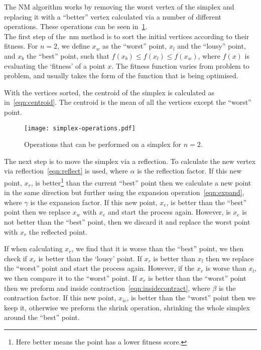 The NM algorithm works by removing the worst vertex of the simplex and replacing it with a ``better'' vertex calculated via a number of different operations.
These operations can be seen in~\cref{fig:NM-operations}.\\

The first step of the~\gls*{nm} method is to sort the initial vertices according to their fitness.
For $n=2$, we define $x_w$ as the ``worst'' point, $x_l$ and the ``lousy'' point, and $x_b$ the ``best'' point, such that $f(x_b)\leq f(x_l)\leq f(x_w)$, where $f(x)$ is evaluating the `fitness' of a point $x$. 
The fitness function varies from problem to problem, and usually takes the form of the function that is being optimised.

With the vertices sorted, the centroid of the simplex is calculated as in~\cref{eqn:centroid}.
The centroid is the mean of all the vertices except the ``worst'' point.

\begin{figure}[!htbp]
    \centering
    \texttt{[image: simplex-operations.pdf]}
    \caption{Operations that can be performed on a simplex for $n=2$.}
    \label{fig:NM-operations}
\end{figure}

The next step is to move the simplex via a reflection.
To calculate the new vertex via reflection~\cref{eqn:reflect} is used, where $\alpha$ is the reflection factor.
If this new point, $x_r$, is better\footnote{Here better means the point has a lower fitness score.} than the current ``best'' point then we calculate a new point in the same direction but further using the expansion operation~\cref{eqn:expand}, where $\gamma$ is the expansion factor.
If this new point, $x_e$, is better than the ``best'' point then we replace $x_w$ with $x_e$ and start the process again.
However, is $x_e$ is not better than the ``best'' point, then we discard it and replace the worst point with $x_r$ the reflected point.

If when calculating $x_r$, we find that it is worse than the ``best'' point, we then check if $x_r$ is better than the `lousy' point.
If $x_r$ is better than $x_l$ then we replace the ``worst'' point and start the process again.
However, if the $x_r$ is worse than $x_l$, we then compare it to the ``worst'' point.
If $x_r$ is better than the ``worst'' point then we preform and inside contraction~\cref{eqn:insidecontract}, where $\beta$ is the contraction factor.
If this new point, $x_{ic}$, is better than the ``worst'' point then we keep it, otherwise we preform the shrink operation, shrinking the whole simplex around the ``best'' point.

